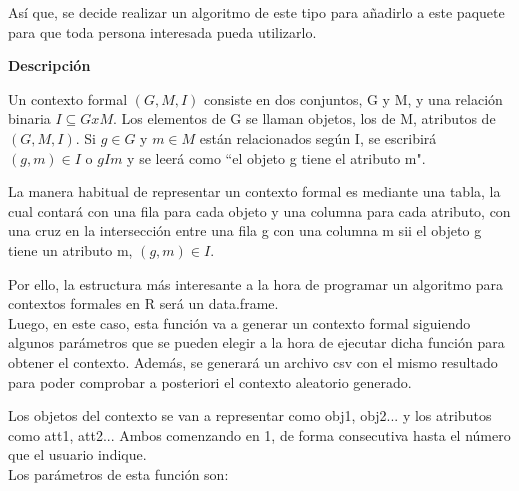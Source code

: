     As\'i que, se decide realizar un algoritmo de este tipo para a\~nadirlo a este paquete para que toda persona interesada pueda 
    utilizarlo.
    

    \textbf{Descripci\'on}

    Un contexto formal \( (G, M, I) \) consiste en dos conjuntos, G y M, y una relaci\'on binaria \( I \subseteq G x M \). Los elementos 
    de G se llaman objetos, los de M, atributos de \( (G, M, I) \). Si \(g \in G\) y \( m \in M \) est\'an relacionados seg\'un I, se escribir\'a 
    \( (g,m) \in I \) o \( g I m \) y se leer\'a como ``el objeto g tiene el atributo m".\cite{ganter}


    La manera habitual de representar un contexto formal es mediante una tabla, la cual contar\'a con una fila para cada objeto y una columna 
    para cada atributo, con una cruz en la intersecci\'on entre una fila g con una columna m sii el objeto g tiene un atributo m, \( (g,m) \in 
    I \).

    Por ello, la estructura m\'as interesante a la hora de programar un algoritmo para contextos formales en R ser\'a un data.frame.
    \\


    Luego, en este caso, esta funci\'on va a generar un contexto formal siguiendo algunos par\'ametros que se pueden elegir a la 
    hora de ejecutar dicha funci\'on para obtener el contexto. Adem\'as, se generar\'a 
    un archivo csv con el mismo resultado para poder comprobar a posteriori el contexto aleatorio generado.

    Los objetos del contexto se van a representar como obj1, obj2... y los atributos como att1, att2... Ambos comenzando en 1, de forma 
    consecutiva hasta el n\'umero que el usuario indique.
    \\

    Los par\'ametros de esta funci\'on son:

